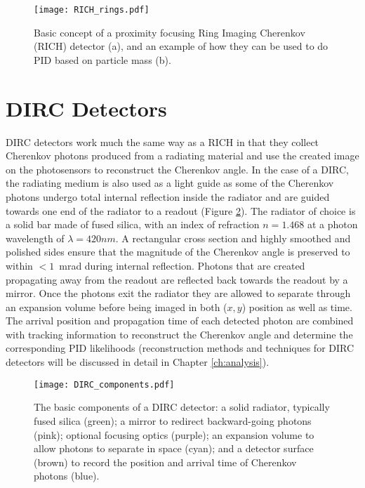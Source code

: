 \begin{figure}[!htb]
	\centering
	\texttt{[image: RICH\_rings.pdf]}
	\caption{Basic concept of a proximity focusing Ring Imaging Cherenkov (RICH) detector (a), and an example of how they can be used to do PID based on particle mass (b).}
	\label{fig:rich_basics}
\end{figure}


\section{DIRC Detectors}
DIRC detectors work much the same way as a RICH in that they collect Cherenkov photons produced from a radiating material and use the created image on the photosensors to reconstruct the Cherenkov angle. In the case of a DIRC, the radiating medium is also used as a light guide as some of the Cherenkov photons undergo total internal reflection inside the radiator and are guided towards one end of the radiator to a readout (Figure \ref{fig:dircbasics}). The radiator of choice is a solid bar made of fused silica, with an index of refraction $n = 1.468$ at a photon wavelength of $\lambda = 420\unit{nm}$. A rectangular cross section and highly smoothed and polished sides ensure that the magnitude of the Cherenkov angle is preserved to within $<1$~mrad during internal reflection. Photons that are created propagating away from the readout are reflected back towards the readout by a mirror. Once the photons exit the radiator they are allowed to separate through an expansion volume before being imaged in both ($x, y$) position as well as time. The arrival position and propagation time of each detected photon are combined with tracking information to reconstruct the Cherenkov angle and determine the corresponding PID likelihoods (reconstruction methods and techniques for DIRC detectors will be discussed in detail in Chapter \ref{ch:analysis}).

\begin{figure}[!htb]
	\centering
	\texttt{[image: DIRC\_components.pdf]}
	\caption{The basic components of a DIRC detector: a solid radiator, typically fused silica (green); a mirror to redirect backward-going photons (pink); optional focusing optics (purple); an expansion volume to allow photons to separate in space (cyan); and a detector surface (brown) to record the position and arrival time of Cherenkov photons (blue).}
	\label{fig:dircbasics}
\end{figure}

